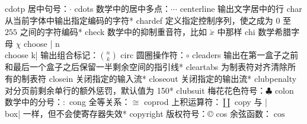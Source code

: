 \capcs cdotp {居中句号：$\cdotp$}{}{}
\capcs cdots {数学中的居中多点：$\cdots$}{}{}%
\capcs centerline {输出文字居中的行}{}{}
\capcs char {从当前字体中输出指定编码的字符}*{}
\capcs chardef {定义指定控制序列，使之成为 0 至 $255$ 之间的字符编码}*{}%
\capcs check {数学中的抑制重音符，比如 $\check x$ 中那样}{}{}
\capcs chi {数学希腊字母 $\chi$}{}{}
\capcs choose {| n\\choose k| 输出组合标记：$n \choose k$}{}{}
\capcs circ {圆圈操作符：$\circ$}{}{}%
\capcs cleaders {输出在第一盒子之前和最后一个盒子之后保留一半剩余空间的指引线}*{}
\capcs cleartabs {为制表符对齐清除所有的制表符}{}{}%
\capcs closein {关闭指定的输入流}*{}
\capcs closeout {关闭指定的输出流}*{}
\capcs clubpenalty {对分页前剩余单行的额外惩罚，默认值为 150}*{}
\capcs clubsuit {梅花花色符号：$\clubsuit$}{}{}
\capcs colon {数学中的分号：$:$}{}{}
\capcs cong {全等关系：$\cong$}{}{}
\capcs coprod {上积运算符：$\coprod$}{}{}
\capcs copy {与 |\\box| 一样，但不会使寄存器失效}*{}
\capcs copyright {版权符号：\copyright}{}{}
\capcs cos {余弦函数：$\cos$}{}{}
